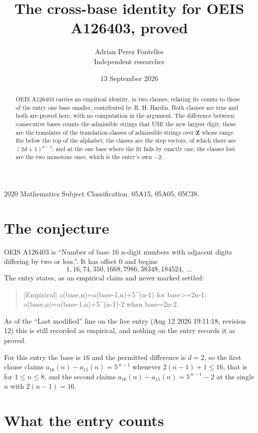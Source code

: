 \documentclass[11pt,a4paper]{article}
\title{The cross-base identity for OEIS A126403, proved}
\author{Adrian Perez Fontelles\\ \small Independent researcher}
\date{13 September 2026}
\theoremstyle{plain}
\theoremstyle{definition}
\begin{document}
\maketitle

\begin{abstract}
OEIS A126403 carries an empirical identity, in two clauses, relating its counts to those of the
entry one base smaller, contributed by R. H. Hardin. Both clauses are true and both are proved
here, with no computation in the argument. The difference between consecutive bases counts the
admissible strings that USE the new largest digit; those are the translates of the
translation-classes of admissible strings over $\mathbf{Z}$ whose range fits below the top of
the alphabet; the classes are the step vectors, of which there are $(2d+1)^{n-1}$; and at the
one base where the fit fails by exactly one, the classes lost are the two monotone ones, which
is the entry's own $-2$.
\end{abstract}

\noindent\small 2020 Mathematics Subject Classification. 05A15, 05A05, 05C38.\normalsize

\section{The conjecture}

OEIS A126403 is ``Number of base 16 n-digit numbers with adjacent digits differing by two or less.''. It has offset $0$ and begins
\[
1, 16, 74, 350, 1668, 7986, 38348, 184524,\ \dots
\]
The entry states, as an empirical claim and never marked settled:
\begin{quote}
[Empirical] a(base,n)=a(base-1,n)+5\textasciicircum{}(n-1) for base>=2n-1; a(base,n)=a(base-1,n)+5\textasciicircum{}(n-1)-2 when base=2n-2.
\end{quote}
As of the ``Last modified'' line on the live entry (Aug 12 2026 19:11:18, revision 12)
this is still recorded as empirical, and nothing on the entry records it as proved.

For this entry the base is $16$ and the permitted difference is $d=2$, so the first clause
claims $a_{16}(n)-a_{15}(n)=5^{\,n-1}$ whenever $2(n-1)+1\le16$, that is for
$1\le n\le8$, and the second claims $a_{16}(n)-a_{15}(n)=5^{\,n-1}-2$ at the single
$n$ with $2(n-1)=16$.

\section{What the entry counts}
\end{document}
